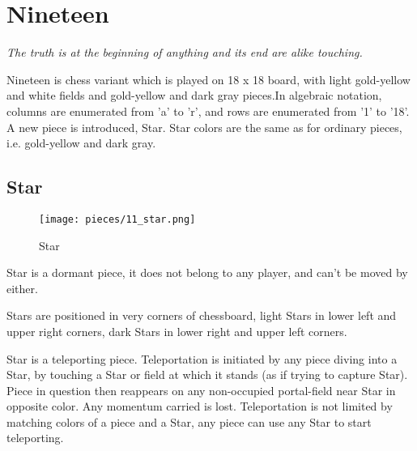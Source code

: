
\chapter*{Nineteen}

\begin{flushright}
\parbox{0.8\textwidth}{
\emph{The truth is at the beginning of anything and its end are alike touching. \\
 } }
\end{flushright}

\noindent
Nineteen is chess variant which is played on 18 x 18 board, with
light gold-yellow and white fields and gold-yellow and dark gray
pieces.In algebraic notation, columns are enumerated from 'a' to 'r',
and rows are enumerated from '1' to '18'. A new piece is introduced,
Star. Star colors are the same as for ordinary pieces, i.e. gold-yellow
and dark gray.

\clearpage %

\section*{Star}

\noindent
\begin{wrapfigure}[11]{l}{0.4\textwidth}
\centering
\texttt{[image: pieces/11\_star.png]}
\caption{Star}
\label{fig:11_star}
\end{wrapfigure}
Star is a dormant piece, it does not belong to any player, and can't be moved by either.

Stars are positioned in very corners of chessboard, light Stars in lower left and upper right
corners, dark Stars in lower right and upper left corners.

Star is a teleporting piece. Teleportation is initiated by any piece diving into a Star, by
touching a Star or field at which it stands (as if trying to capture Star). Piece in question
then reappears on any non-occupied portal-field near Star in opposite color. Any momentum
carried is lost. Teleportation is not limited by matching colors of a piece and a Star, any
piece can use any Star to start teleporting.

